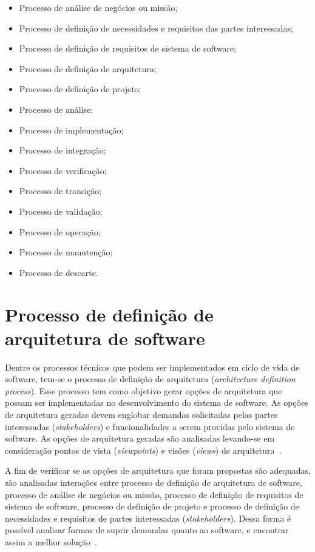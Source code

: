 \begin{itemize}
    \item Processo de análise de negócios ou missão;
    \item Processo de definição de necessidades e requisitos das partes interessadas;
    \item Processo de definição de requisitos de sistema de software;
    \item Processo de definição de arquitetura;
    \item Processo de definição de projeto;
    \item Processo de análise;
    \item Processo de implementação;
    \item Processo de integração;
    \item Processo de verificação;
    \item Processo de transição;
    \item Processo de validação;
    \item Processo de operação;
    \item Processo de manutenção;
    \item Processo de descarte. 
\end{itemize}
      
\section{Processo de definição de arquitetura de software}

Dentre os processos técnicos que podem ser implementados em ciclo de vida de software, tem-se o processo de definição de arquitetura (\emph{architecture definition process}). Esse processo tem como objetivo gerar opções de arquitetura que possam ser implementadas no desenvolvimento do sistema de software. As opções de arquitetura geradas devem englobar demandas solicitadas pelas partes interessadas (\emph{stakeholders}) e funcionalidades a serem providas pelo sistema de software. As opções de arquitetura geradas são analisadas levando-se em consideração pontos de vista (\emph{viewpoints}) e visões (\emph{views}) de arquitetura~\cite{ISO_12207}. 

A fim de verificar se as opções de arquitetura que foram propostas são adequadas, são analisadas interações entre processo de definição de arquitetura de software, processo de análise de negócios ou missão, processo de definição de requisitos de sistema de software, processo de definição de projeto e processo de definição de necessidades e requisitos de partes interessadas (\emph{stakeholders}). Dessa forma é possível analisar formas de suprir demandas quanto ao software, e encontrar assim a melhor solução~\cite{ISO_12207}. 

